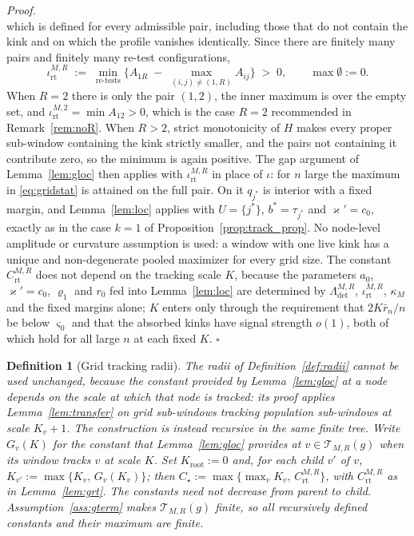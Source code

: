 \documentclass[12pt, a4paper]{article}
\newcommand{\qed}{\hfill$\square$}
\newenvironment{proof}[1][Proof]{\par\noindent\textit{#1.}\space}{\qed\par\medskip}
\newtheorem{defin}{Definition}[section]
\begin{document}
\begin{proof}
\[\]
which is defined for every admissible pair, including those that do not contain the kink and on which the profile vanishes identically. Since there are finitely many pairs and finitely many re-test configurations,
\[
\iota^{M,R}_{\mathrm{rt}} \;:=\; \min_{\text{re-tests}} \Big\{ A_{1R} \;-\; \max_{(i,j) \ne (1,R)} A_{ij} \Big\} \;>\; 0 ,
\qquad \max\emptyset := 0 .
\]
When $R = 2$ there is only the pair $(1,2)$, the inner maximum is over the empty set, and $\iota^{M,2}_{\mathrm{rt}} = \min A_{12} > 0$, which is the case $R = 2$ recommended in Remark~\ref{rem:noR}. When $R > 2$, strict monotonicity of $H$ makes every proper sub-window containing the kink strictly smaller, and the pairs not containing it contribute zero, so the minimum is again positive. The gap argument of Lemma~\ref{lem:gloc} then applies with $\iota^{M,R}_{\mathrm{rt}}$ in place of $\iota$: for $n$ large the maximum in \eqref{eq:gridstat} is attained on the full pair. On it $q_{j^*}$ is interior with a fixed margin, and Lemma~\ref{lem:loc} applies with $U = \{j^*\}$, $b^* = \tau_{j^*}$ and $\varkappa' = c_0$, exactly as in the case $k=1$ of Proposition~\ref{prop:track_prop}. No node-level amplitude or curvature assumption is used: a window with one live kink has a unique and non-degenerate pooled maximizer for every grid size. The constant $C^{M,R}_{\mathrm{rt}}$ does not depend on the tracking scale $K$, because the parameters $a_0$, $\varkappa' = c_0$, $\varrho_1$ and $r_0$ fed into Lemma~\ref{lem:loc} are determined by $\Lambda^{M,R}_{\mathrm{det}}$, $\iota^{M,R}_{\mathrm{rt}}$, $\kappa_M$ and the fixed margins alone; $K$ enters only through the requirement that $2K\bar r_n/n$ be below $\varsigma_0$ and that the absorbed kinks have signal strength $o(1)$, both of which hold for all large $n$ at each fixed $K$. 
\end{proof}

\begin{defin}[Grid tracking radii]
\label{def:gradii}
The radii of Definition~\ref{def:radii} cannot be used unchanged, because the constant provided by Lemma~\ref{lem:gloc} at a node depends on the scale at which that node is tracked: its proof applies Lemma~\ref{lem:transfer} on grid sub-windows tracking population sub-windows at scale $K_v+1$. The construction is instead recursive in the same finite tree. Write $G_v(K)$ for the constant that Lemma~\ref{lem:gloc} provides at $v \in \mathcal{T}_{M,R}(g)$ when its window tracks $v$ at scale $K$. Set $K_{\mathrm{root}} := 0$ and, for each child $v'$ of $v$, $K_{v'} := \max\{K_v,\, G_v(K_v)\}$; then $C_\star := \max\{\max_v K_v,\, C^{M,R}_{\mathrm{rt}}\}$, with $C^{M,R}_{\mathrm{rt}}$ as in Lemma~\ref{lem:grt}. The constants need not decrease from parent to child. Assumption~\ref{ass:gterm} makes $\mathcal{T}_{M,R}(g)$ finite, so all recursively defined constants and their maximum are finite.
\end{defin}
\end{document}
